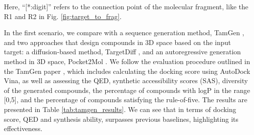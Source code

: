 Here, ``[*:digit]'' refers to the connection point of the molecular fragment, like the R1 and R2 in Fig. \ref{fig:target_to_frag}.

In the first scenario, we compare \ourM{} with a sequence generation method, TamGen \cite{TamGen}, and two approaches that design compounds in 3D space based on the input target: a diffusion-based method, TargetDiff \cite{targetdiff}, and an autoregressive generation method in 3D space, Pocket2Mol \cite{pocket2mol}. We follow the evaluation procedure outlined in the TamGen paper \cite{TamGen}, which includes calculating the docking score using AutoDock Vina, as well as assessing the QED, synthetic accessibility scores (SAS), diversity of the generated compounds, the percentage of compounds with logP in the range [0,5], and the percentage of compounds satisfying the rule-of-five. The results are presented in Table \ref{tab:tamgen_results}. We can see that in terms of docking score, QED and synthesis ability, \ourM{} surpasses previous baselines, highlighting its effectiveness.  


